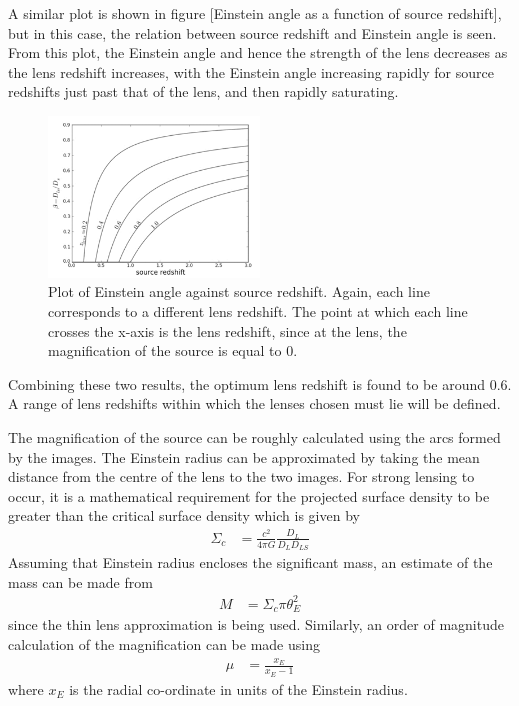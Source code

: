 	A similar plot is shown in figure [Einstein angle as a function of source redshift], but in this case, the relation between source redshift and Einstein angle is seen. From this plot, the Einstein angle and hence the strength of the lens decreases as the lens redshift increases, with the Einstein angle increasing rapidly for source redshifts just past that of the lens, and then rapidly saturating.
	\begin{figure}[!htb]
		\centering
			\includegraphics[width=0.5\textwidth]{../Images/Einstein_angle_as_a_function_of_source_redshift.png}
		\caption[Einstein angle as a function of source redshift]{\cite{Constraining_source_redshift_distributions} Plot of Einstein angle against source redshift. Again, each line corresponds to a different lens redshift. The point at which each line crosses the x-axis is the lens redshift, since at the lens, the magnification of the source is equal to 0.\label{fig:Einstein_angle_as_a_function_of_source_redshift}}
	\end{figure}

	Combining these two results, the optimum lens redshift is found to be around 0.6. A range of lens redshifts within which the lenses chosen must lie will be defined.

	The magnification of the source can be roughly calculated using the arcs formed by the images. The Einstein radius can be approximated by taking the mean distance from the centre of the lens to the two images. For strong lensing to occur, it is a mathematical requirement for the projected surface density to be greater than the critical surface density which is given by\cite{Critical_surface_density}
	\begin{align}
		\Sigma_c &= \frac{c^2}{4\pi G}\frac{D_L}{D_L D_{LS}}
	\end{align}
	Assuming that Einstein radius encloses the significant mass, an estimate of the mass can be made from
	\begin{align}
		M &= \Sigma_c \pi \theta_E^2
	\end{align}
	since the thin lens approximation is being used. Similarly, an order of magnitude calculation of the magnification can be made using
	\begin{align}
		\mu &= \frac{x_E}{x_E -1}
	\end{align}
	where $x_E$ is the radial co-ordinate in units of the Einstein radius\cite{Lens_mass_estimate}.
